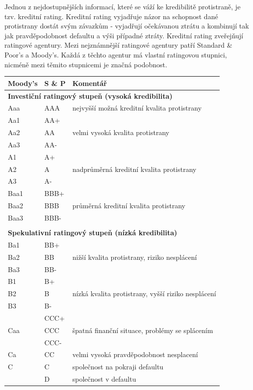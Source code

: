 \documentclass[a4paper]{book}
\begin{document}
Jednou z nejdostupnějších informací, které se váží ke kredibilitě protistraně, je tzv. kreditní rating. Kreditní rating vyjadřuje názor na schopnost dané protistrany dostát svým závazkům - vyjadřují očekávanou ztrátu a kombinují tak jak pravděpodobnost defaultu a výši případné ztráty. Kreditní rating zveřejňují ratingové agentury. Mezi nejznámnější ratingové agentury patří Standard \& Poor's a Moody's. Každá z těchto agentur má vlastní ratingovou stupnici, nicméně mezi těmito stupnicemi je značná podobnost.
\begin{center}
\begin{tabular}{l l l}
\textbf{Moody's} & \textbf{S \& P} & \textbf{Komentář} \\
\hline
\multicolumn{3}{l}{\textbf{Investiční ratingový stupeň (vysoká kredibilita)}} \\
Aaa  & AAA  & nejvyšší možná kreditní kvalita protistrany\\
Aa1  & AA+  & \multirow{3}{*}{velmi vysoká kvalita protistrany} \\
Aa2  & AA   & \\
Aa3  & AA-  & \\
A1   & A+   & \multirow{3}{*}{nadprůměrná kreditní kvalita protistrany} \\
A2   & A    & \\
A3   & A-   & \\
Baa1 & BBB+ & \multirow{3}{*}{průměrná kreditní kvalita protistrany} \\
Baa2 & BBB  & \\
Baa3 & BBB- & \\
\\
\multicolumn{3}{l}{\textbf{Spekulativní ratingový stupeň (nízká kredibilita)}} \\
Ba1  & BB+  & \multirow{3}{*}{nižší kvalita protistrany, riziko nesplácení} \\
Ba2  & BB   & \\
Ba3  & BB-  & \\
B1   & B+   & \multirow{3}{*}{nízká kvalita protistrany, vyšší riziko nesplácení} \\
B2   & B    & \\
B3   & B-   & \\
\multirow{3}{*}{Caa} & CCC+ & \multirow{3}{*}{špatná finanční situace, problémy se splácením} \\
     & CCC  & \\
     & CCC- & \\
Ca   & CC   & velmi vysoká pravděpodobnost nesplacení\\
C    & C    & společnost na pokraji defaultu \\
     & D    & společnost v defaultu \\
\end{tabular}
\end{center}
\end{document}
